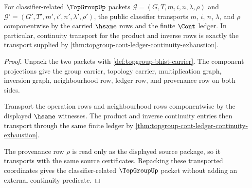 \begin{theorem}
\label{thm:topgroup-classifier-continuity-transport}
For classifier-related $\TopGroupUp$ packets
$\mathcal G=(G,T,m,i,n,\lambda,\rho)$ and
$\mathcal G'=(G',T',m',i',n',\lambda',\rho')$, the public classifier
transports $m$, $i$, $n$, $\lambda$, and $\rho$ componentwise by the carried
$\hsame$ rows and the finite $\Cont$ ledger. In particular, continuity
transport for the product and inverse rows is exactly the transport supplied
by \autoref{thm:topgroup-cont-ledger-continuity-exhaustion}.
\end{theorem}
\begin{proof}
Unpack the two packets with \autoref{def:topgroup-bhist-carrier}. The
component projections give the group carrier, topology carrier, multiplication
graph, inversion graph, neighbourhood row, ledger row, and provenance row on
both sides.

Transport the operation rows and neighbourhood rows componentwise by the
displayed $\hsame$ witnesses. The product and inverse continuity entries then
transport through the same finite ledger by
\autoref{thm:topgroup-cont-ledger-continuity-exhaustion}.

The provenance row $\rho$ is read only as the displayed source package, so it
transports with the same source certificates. Repacking these transported
coordinates gives the classifier-related $\TopGroupUp$ packet without adding
an external continuity predicate.
\end{proof}

